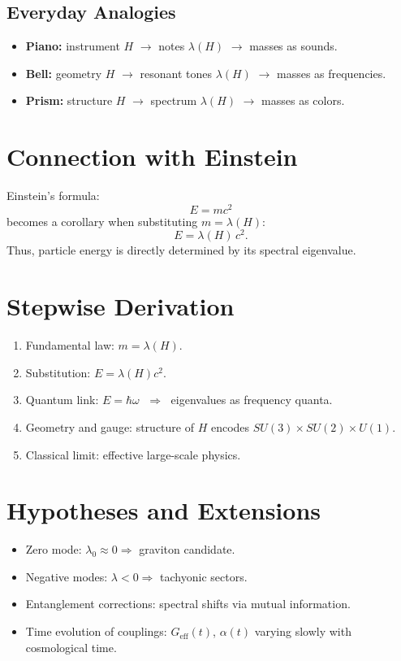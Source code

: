 \documentclass[12pt,a4paper]{article}
\begin{document}
\subsection*{Everyday Analogies}
\begin{itemize}
  \item  \textbf{Piano:} instrument $H$ $\rightarrow$ notes $\lambda(H)$ $\rightarrow$ masses as sounds.
  \item  \textbf{Bell:} geometry $H$ $\rightarrow$ resonant tones $\lambda(H)$ $\rightarrow$ masses as frequencies.
  \item  \textbf{Prism:} structure $H$ $\rightarrow$ spectrum $\lambda(H)$ $\rightarrow$ masses as colors.
\end{itemize}

\section*{Connection with Einstein}
Einstein’s formula:
\[
E = mc^2
\]
becomes a corollary when substituting $m = \lambda(H)$:
\[
E = \lambda(H) \, c^2.
\]
Thus, particle energy is directly determined by its spectral eigenvalue.

\section*{Stepwise Derivation}
\begin{enumerate}
  \item Fundamental law: $m = \lambda(H)$.
  \item Substitution: $E = \lambda(H)c^2$.
  \item Quantum link: $E = \hbar \omega$ $\;\Rightarrow\;$ eigenvalues as frequency quanta.
  \item Geometry and gauge: structure of $H$ encodes $SU(3)\times SU(2)\times U(1)$.
  \item Classical limit: effective large-scale physics.
\end{enumerate}

\section*{Hypotheses and Extensions}
\begin{itemize}
  \item Zero mode: $\lambda_0 \approx 0 \Rightarrow$ graviton candidate.
  \item Negative modes: $\lambda<0 \Rightarrow$ tachyonic sectors.
  \item Entanglement corrections: spectral shifts via mutual information.
  \item Time evolution of couplings: $G_\mathrm{eff}(t)$, $\alpha(t)$ varying slowly with cosmological time.
\end{itemize}
\end{document}
